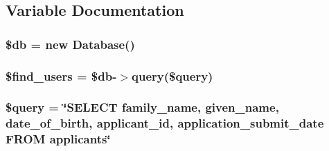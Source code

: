 \subsection{Variable Documentation}
\hypertarget{app__cleanup_8php_a1fa3127fc82f96b1436d871ef02be319}{
\subsubsection[{\$db}]{\setlength{\rightskip}{0pt plus 5cm}\$db = new Database()}}\label{app__cleanup_8php_a1fa3127fc82f96b1436d871ef02be319}
\hypertarget{app__cleanup_8php_a09bc8ccbc60307ba2d4bfe5af5d2b9e5}{
\subsubsection[{\$find\-\_\-users}]{\setlength{\rightskip}{0pt plus 5cm}\$find\-\_\-users = \$db-\/$>$query(\$query)}}\label{app__cleanup_8php_a09bc8ccbc60307ba2d4bfe5af5d2b9e5}
\hypertarget{app__cleanup_8php_af59a5f7cd609e592c41dc3643efd3c98}{
\subsubsection[{\$query}]{\setlength{\rightskip}{0pt plus 5cm}\$query = \char`\"{}S\-E\-L\-E\-C\-T family\-\_\-name, given\-\_\-name, date\-\_\-of\-\_\-birth, applicant\-\_\-id, application\-\_\-submit\-\_\-date F\-R\-O\-M applicants\char`\"{}}}\label{app__cleanup_8php_af59a5f7cd609e592c41dc3643efd3c98}
